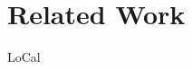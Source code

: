 \section{Related Work}

LoCal~\cite{DBLP:conf/pldi/VollmerKRS0N19}


\cite{DBLP:journals/pacmpl/KoparkarRVKN21}
